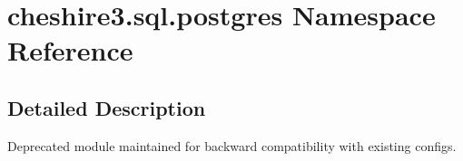 \hypertarget{namespacecheshire3_1_1sql_1_1postgres}{\section{cheshire3.\-sql.\-postgres Namespace Reference}
\label{namespacecheshire3_1_1sql_1_1postgres}
}


\subsection{Detailed Description}
\begin{DoxyVerb}Deprecated module maintained for backward compatibility with existing configs.\end{DoxyVerb}
 